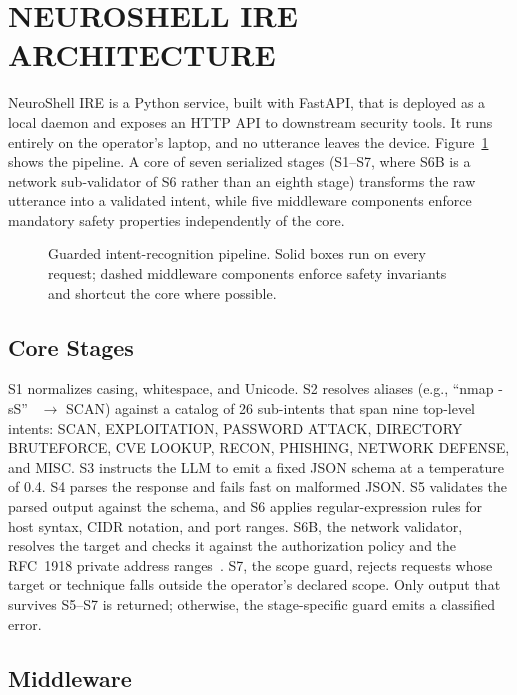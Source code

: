 \documentclass[a4paper,twoside]{article}
\begin{document}
\section{\uppercase{NeuroShell IRE Architecture}}
\label{sec:architecture}

\noindent NeuroShell IRE is a Python service, built with FastAPI, that is deployed as a local daemon and exposes an HTTP API to downstream security tools. It runs entirely on the operator's laptop, and no utterance leaves the device. Figure~\ref{fig:pipeline} shows the pipeline. A core of seven serialized stages (S1--S7, where S6B is a network sub-validator of S6 rather than an eighth stage) transforms the raw utterance into a validated intent, while five middleware components enforce mandatory safety properties independently of the core.

\begin{figure}[!t]
  \centering
  {}
  \caption{Guarded intent-recognition pipeline. Solid boxes run on every request; dashed middleware components enforce safety invariants and shortcut the core where possible.}
  \label{fig:pipeline}
\end{figure}

\subsection{Core Stages}

\noindent S1 normalizes casing, whitespace, and Unicode. S2 resolves aliases (e.g., ``nmap -sS''~\cite{Lyon09} $\rightarrow$ SCAN) against a catalog of 26 sub-intents that span nine top-level intents: SCAN, EXPLOITATION, PASSWORD ATTACK, DIRECTORY BRUTEFORCE, CVE LOOKUP, RECON, PHISHING, NETWORK DEFENSE, and MISC. S3 instructs the LLM to emit a fixed JSON schema at a temperature of 0.4. S4 parses the response and fails fast on malformed JSON. S5 validates the parsed output against the schema, and S6 applies regular-expression rules for host syntax, CIDR notation, and port ranges. S6B, the network validator, resolves the target and checks it against the authorization policy and the RFC~1918 private address ranges~\cite{RFC1918}. S7, the scope guard, rejects requests whose target or technique falls outside the operator's declared scope. Only output that survives S5--S7 is returned; otherwise, the stage-specific guard emits a classified error.

\subsection{Middleware}
\end{document}
